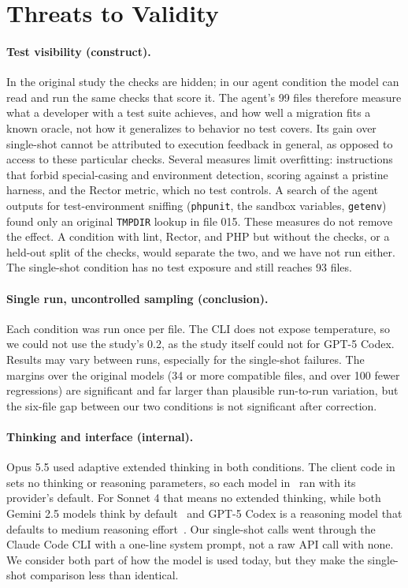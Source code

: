 \documentclass[11pt]{article}
\newcommand{\code}[1]{\texttt{#1}}
\begin{document}
\section{Threats to Validity}
\label{sec:threats}

\paragraph{Test visibility (construct).}
In the original study the checks are hidden; in our agent condition the model can read and run the same checks that score it.
The agent's 99 files therefore measure what a developer with a test suite achieves, and how well a migration fits a known oracle, not how it generalizes to behavior no test covers.
Its gain over single-shot cannot be attributed to execution feedback in general, as opposed to access to these particular checks.
Several measures limit overfitting: instructions that forbid special-casing and environment detection, scoring against a pristine harness, and the Rector metric, which no test controls.
A search of the agent outputs for test-environment sniffing (\code{phpunit}, the sandbox variables, \code{getenv}) found only an original \code{TMPDIR} lookup in file 015.
These measures do not remove the effect.
A condition with lint, Rector, and PHP but without the checks, or a held-out split of the checks, would separate the two, and we have not run either.
The single-shot condition has no test exposure and still reaches 93 files.

\paragraph{Single run, uncontrolled sampling (conclusion).}
Each condition was run once per file.
The CLI does not expose temperature, so we could not use the study's 0.2, as the study itself could not for GPT-5 Codex.
Results may vary between runs, especially for the single-shot failures.
The margins over the original models (34 or more compatible files, and over 100 fewer regressions) are significant and far larger than plausible run-to-run variation, but the six-file gap between our two conditions is not significant after correction.

\paragraph{Thinking and interface (internal).}
Opus 5.5 used adaptive extended thinking in both conditions.
The client code in~\cite{mahmud2026package} sets no thinking or reasoning parameters, so each model in~\cite{mahmud2026modernization} ran with its provider's default.
For Sonnet 4 that means no extended thinking, while both Gemini 2.5 models think by default~\cite{gemini2026thinking} and GPT-5 Codex is a reasoning model that defaults to medium reasoning effort~\cite{openai2025gpt5codexmodel}.
Our single-shot calls went through the Claude Code CLI with a one-line system prompt, not a raw API call with none.
We consider both part of how the model is used today, but they make the single-shot comparison less than identical.
\end{document}

